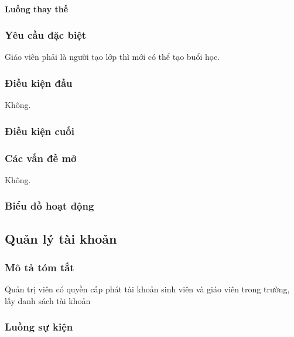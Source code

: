 \documentclass[./../main_file.tex]{subfiles}
\begin{document}
\paragraph{Luồng thay thế}
\subsubsection{Yêu cầu đặc biệt}
Giáo viên phải là người tạo lớp thì mới có thể tạo buổi học.

\subsubsection{Điều kiện đầu}
Không.

\subsubsection{Điều kiện cuối}

\subsubsection{Các vấn đề mở}
Không.

\subsubsection{Biểu đồ hoạt động}

\subsection{Quản lý tài khoản}
\subsubsection{Mô tả tóm tắt}
Quản trị viên có quyền cấp phát tài khoản sinh viên và giáo viên trong trường, lấy danh sách tài khoản

\subsubsection{Luồng sự kiện}
\end{document}
